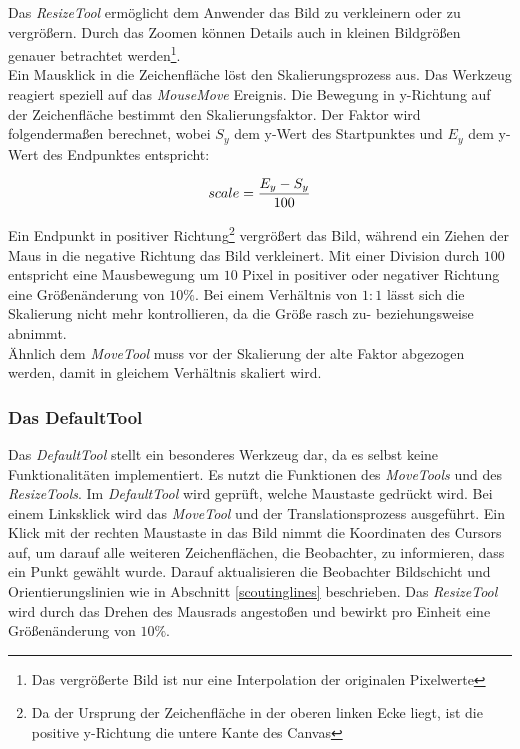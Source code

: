 Das \textit{ResizeTool} ermöglicht dem Anwender das Bild zu verkleinern oder zu vergrößern. Durch das Zoomen können Details auch in kleinen Bildgrößen genauer betrachtet werden\footnote{Das vergrößerte Bild ist nur eine Interpolation der originalen Pixelwerte}.\\
Ein Mausklick in die Zeichenfläche löst den Skalierungsprozess aus. Das Werkzeug reagiert speziell auf das \textit{MouseMove} Ereignis. Die Bewegung in y-Richtung auf der Zeichenfläche bestimmt den Skalierungsfaktor. Der Faktor wird folgendermaßen berechnet, wobei $S_y$ dem y-Wert des Startpunktes  und $E_y$ dem y-Wert des Endpunktes entspricht: 

\begin{equation}
scale = \frac{E_y - S_y}{100}
\vspace{0.5cm}
\end{equation}

Ein Endpunkt in positiver Richtung\footnote{Da der Ursprung der Zeichenfläche in der oberen linken Ecke liegt, ist die positive y-Richtung die untere Kante des Canvas} vergrößert das Bild, während ein Ziehen der Maus in die negative Richtung das Bild verkleinert. Mit einer Division durch $100$ entspricht eine Mausbewegung um $10$ Pixel in positiver oder negativer Richtung eine Größenänderung von $10\%$. Bei einem Verhältnis von $1:1$ lässt sich die Skalierung nicht mehr kontrollieren, da die Größe rasch zu- beziehungsweise abnimmt.\\
Ähnlich dem \textit{MoveTool} muss vor der Skalierung der alte Faktor abgezogen werden, damit in gleichem Verhältnis skaliert wird.

\subsubsection{Das DefaultTool}

Das \textit{DefaultTool} stellt ein besonderes Werkzeug dar, da es selbst keine Funktionalitäten implementiert. Es nutzt die Funktionen des \textit{MoveTools} und des \textit{ResizeTools}. Im \textit{DefaultTool} wird geprüft, welche Maustaste gedrückt wird. Bei einem Linksklick wird das \textit{MoveTool} und der Translationsprozess ausgeführt. Ein Klick mit der rechten Maustaste in das Bild nimmt die Koordinaten des Cursors auf, um darauf alle weiteren Zeichenflächen, die Beobachter, zu informieren, dass ein Punkt gewählt wurde. Darauf aktualisieren die Beobachter Bildschicht und Orientierungslinien wie in Abschnitt \ref{scoutinglines} beschrieben. Das \textit{ResizeTool} wird durch das Drehen des Mausrads angestoßen und bewirkt pro Einheit eine Größenänderung von $10\%$.

